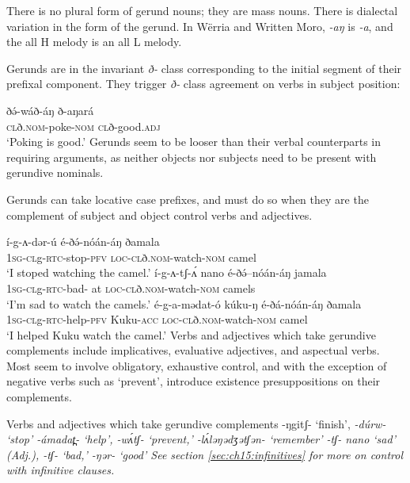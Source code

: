 There is no plural form of gerund nouns; they are mass nouns. There is dialectal variation in the form of the gerund. In W\"erria and Written Moro, \textit{-aŋ} is \textit{-a}, and the all H melody is an all L melody.


Gerunds are in the invariant \textit{ð-} class corresponding to the initial segment of their prefixal component. They trigger \textit{ð-} class agreement on verbs in subject position:

\ea \gll 	ðə́-wáð-áŋ		ð-aŋará\\
		\textsc{cl}ð.\textsc{nom-}poke-\textsc{nom}	 \textsc{cl}ð-good.\textsc{adj}\\
	\glt ‘Poking is good.’	
\z
Gerunds seem to be looser than their verbal counterparts in requiring arguments, as neither objects nor subjects need to be present with gerundive nominals.

Gerunds can take locative case prefixes, and must do so when they are the complement of subject and object control verbs and adjectives.

\ea \gll í-g-ʌ-dər-ú é-ðə́-nóán-áŋ ðamala\\ %
		\textsc{1sg-cl}g-\textsc{rtc-}stop-\textsc{pfv} \textsc{loc-}\textsc{cl}ð.\textsc{nom-}watch-\textsc{nom} camel\\
	\glt 	‘I stoped watching the camel.’\label{ex:ch6:gercon1}
\ex	\gll í-g-ʌ-tʃ-ʌ́  nano é-ðə́--nóán-áŋ jamala	\\
		\textsc{1sg-}\textsc{cl}g-\textsc{rtc-}bad- at \textsc{loc-}\textsc{cl}ð.\textsc{nom-}watch-\textsc{nom} camels \\
	\glt ‘I’m sad to watch the camels.’
\ex \gll é-g-a-mədat-ó kúku-ŋ é-ðá-nóán-áŋ ðamala\\ %
		\textsc{1sg-cl}g-\textsc{rtc-}help-\textsc{pfv} Kuku-\textsc{acc} \textsc{loc-}\textsc{cl}ð.\textsc{nom-}watch-\textsc{nom} camel\\
	\glt 	‘I helped Kuku watch the camel.’\label{ex:ch6:gercon3}
\z 
Verbs and adjectives which take gerundive complements include implicatives, evaluative adjectives, and aspectual verbs. Most seem to involve obligatory, exhaustive control, and with the exception of negative verbs such as `prevent', introduce existence presuppositions on their complements.

\ea  Verbs and adjectives which take gerundive complements
  {-ŋgitʃ-} `finish', \it{-dúrw-} `stop'
 {-ámadat̪-} `help', \it{-wʌ́tʃ-} `prevent,' {-lʌ́ləŋədʒətʃən-} `remember'
 \it{-tʃ- nano} `sad' (Adj.), {-tʃ-} `bad,' {-ŋər-} `good'
\z 
\z 
See section \ref{sec:ch15:infinitives} for more on control with infinitive clauses.

